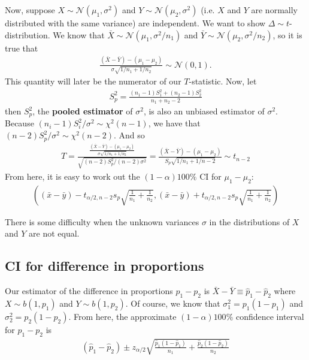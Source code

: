 \documentclass{book}
\theoremstyle{definition}
\newcommand{\N}{\mathcal{N}}
\newcommand{\f}[2]{\frac{#1}{#2}}
\newcommand{\lp}{\left(}
\newcommand{\rp}{\right)}
\begin{document}
Now, suppose ${X} \sim \N(\mu_1, \sigma^2)$ and ${Y} \sim \N(\mu_2, \sigma^2)$ (i.e. $X$ and $Y$ are normally distributed with the same variance) are independent. We want to show $\Delta \sim t$-distribution. We know that $\bar{X} \sim \N(\mu_1, \sigma^2/n_1)$ and $\bar{Y} \sim \N(\mu_2, \sigma^2/n_2)$, so it is true that
\begin{align}
\f{(\bar{X} - \bar{Y}) - (\mu_1 - \mu_2)}{\sigma\sqrt{1/n_1 + 1/n_2}} \sim \N(0,1).
\end{align}
This quantity will later be the numerator of our $T$-statistic. Now, let
\begin{align}
S_p^2 = \f{(n_1-1)S_1^2 + (n_2-1)S_2^2}{n_1 + n_2 - 2}
\end{align}
then $S_p^2$, the \textbf{pooled estimator} of $\sigma^2$, is also an unbiased estimator of $\sigma^2$. Because $(n_i - 1)S_i^2/\sigma^2 \sim \chi^2(n-1)$, we have that $(n-2)S_p^2/\sigma^2 \sim\chi^2(n-2)$. And so
\begin{align}
\boxed{T = \f{\f{(\bar{X} - \bar{Y}) - (\mu_1 - \mu_2)}{\sigma\sqrt{1/n_1 + 1/n_2}}}{\sqrt{(n-2)S_p^2/(n-2)\sigma^2}} = \f{(\bar{X} - \bar{Y}) - (\mu_1 - \mu_2)}{S_p\sqrt{1/n_1 + 1/n-2}} \sim t_{n-2}}
\end{align}
From here, it is easy to work out the $(1-\alpha)100\%$ CI for $\mu_1 - \mu_2$:
\begin{align}
\boxed{\lp (\bar{x}-\bar{y})-t_{\alpha/2,n-2}s_p\sqrt{\f{1}{n_1}+ \f{1}{n_2}},  (\bar{x}-\bar{y}) + t_{\alpha/2,n-2}s_p\sqrt{\f{1}{n_1}+ \f{1}{n_2}} \rp}
\end{align}

There is some difficulty when the unknown variances $\sigma$ in the distributions of $X$ and $Y$ are not equal. 


\subsection{CI for difference in proportions}

Our estimator of the difference in proportions $p_1 - p_2$ is $\bar{X} - \bar{Y} \equiv \hat{p}_1 - \hat{p}_2$ where $X \sim b(1,p_1)$ and $Y \sim b(1,p_2)$. Of course, we know that $\sigma_1^2 = p_1(1 - p_1)$ and $\sigma_2^2 = p_2(1 - p_2)$. From here, the approximate $(1-\alpha)100\%$ confidence interval for $p_1 - p_2$ is 
\begin{align}
\boxed{(\hat{p}_1 - \hat{p}_2) \pm z_{\alpha/2}\sqrt{\f{\hat{p}_1(1-\hat{p}_1)}{n_1} + \f{\hat{p}_2(1-\hat{p}_2)}{n_2}}}
\end{align}
\end{document}
